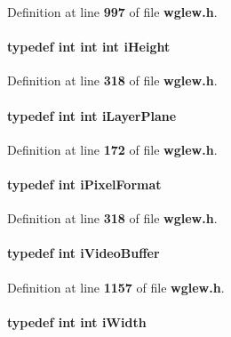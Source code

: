 Definition at line {\bf 997} of file {\bf wglew.\+h}.

\paragraph[{i\+Height}]{\setlength{\rightskip}{0pt plus 5cm}typedef {\bf int} {\bf int} {\bf int} {\bf i\+Height}}\label{wglew_8h_a39ec6c6cbc64ff726f20a1398f026fd9}


Definition at line {\bf 318} of file {\bf wglew.\+h}.

\paragraph[{i\+Layer\+Plane}]{\setlength{\rightskip}{0pt plus 5cm}typedef {\bf int} {\bf int} {\bf i\+Layer\+Plane}}\label{wglew_8h_acd1d4ba2057248b69d5fda1a765b6c4c}


Definition at line {\bf 172} of file {\bf wglew.\+h}.

\paragraph[{i\+Pixel\+Format}]{\setlength{\rightskip}{0pt plus 5cm}typedef {\bf int} {\bf i\+Pixel\+Format}}\label{wglew_8h_ac1fc7b5b3d46c4439d17890974c8b41e}


Definition at line {\bf 318} of file {\bf wglew.\+h}.

\paragraph[{i\+Video\+Buffer}]{\setlength{\rightskip}{0pt plus 5cm}typedef {\bf int} {\bf i\+Video\+Buffer}}\label{wglew_8h_a828402df42454da09f21b6f165498412}


Definition at line {\bf 1157} of file {\bf wglew.\+h}.

\paragraph[{i\+Width}]{\setlength{\rightskip}{0pt plus 5cm}typedef {\bf int} {\bf int} {\bf i\+Width}}\label{wglew_8h_a30fafed225cae9e58d3fe93fe778565b}



